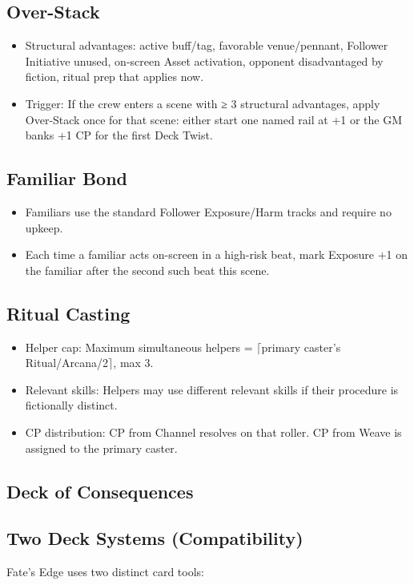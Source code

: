 \documentclass[11pt]{article}
\begin{document}
\subsection{Over-Stack}
\begin{itemize}
    \item Structural advantages: active buff/tag, favorable venue/pennant, Follower Initiative unused, on-screen Asset activation, opponent disadvantaged by fiction, ritual prep that applies now.
    \item Trigger: If the crew enters a scene with ≥ 3 structural advantages, apply Over-Stack once for that scene: either start one named rail at +1 or the GM banks +1 CP for the first Deck Twist.
\end{itemize}

\subsection{Familiar Bond}
\begin{itemize}
    \item Familiars use the standard Follower Exposure/Harm tracks and require no upkeep.
    \item Each time a familiar acts on-screen in a high-risk beat, mark Exposure +1 on the familiar after the second such beat this scene.
\end{itemize}

\subsection{Ritual Casting}
\begin{itemize}
    \item Helper cap: Maximum simultaneous helpers = $\lceil$primary caster's Ritual/Arcana/2$\rceil$, max 3.
    \item Relevant skills: Helpers may use different relevant skills if their procedure is fictionally distinct.
    \item CP distribution: CP from Channel resolves on that roller. CP from Weave is assigned to the primary caster.
\end{itemize}

\subsection{Deck of Consequences}

\subsection{Two Deck Systems (Compatibility)}
Fate's Edge uses two distinct card tools:
\end{document}
